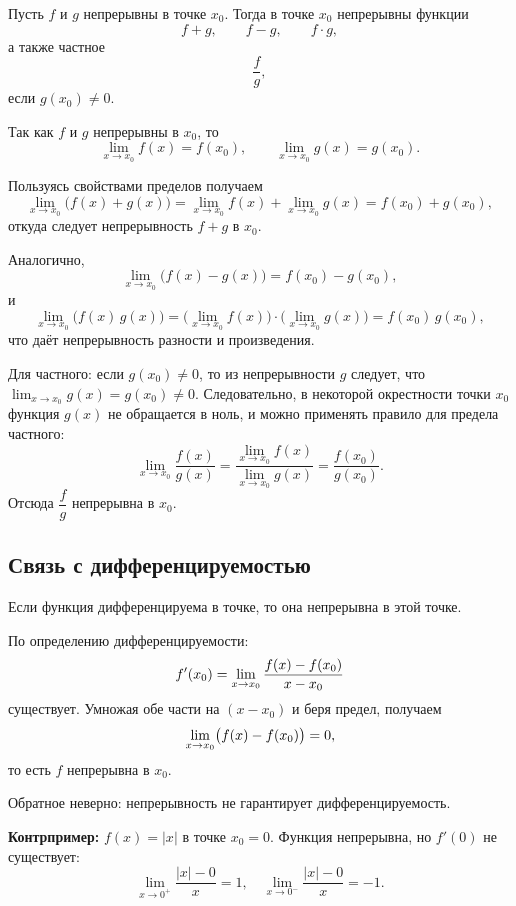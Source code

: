 \begin{theorem}
Пусть \(f\) и \(g\) непрерывны в точке \(x_0\). Тогда в точке \(x_0\) непрерывны функции
\[
f+g,\qquad f-g,\qquad f\cdot g,
\]
а также частное
\[
\frac{f}{g},
\]
если \(g(x_0)\neq0\).
\end{theorem}

\begin{Proof}
Так как \(f\) и \(g\) непрерывны в \(x_0\), то
\[
\lim_{x\to x_0} f(x)=f(x_0),\qquad \lim_{x\to x_0} g(x)=g(x_0).
\]

Пользуясь свойствами пределов получаем
\[
\lim_{x\to x_0}\bigl(f(x)+g(x)\bigr)
=\lim_{x\to x_0}f(x)+\lim_{x\to x_0}g(x)
=f(x_0)+g(x_0),
\]
откуда следует непрерывность \(f+g\) в \(x_0\).

Аналогично,
\[
\lim_{x\to x_0}\bigl(f(x)-g(x)\bigr)
=f(x_0)-g(x_0),
\]
и
\[
\lim_{x\to x_0}\bigl(f(x)\,g(x)\bigr)
=\bigl(\lim_{x\to x_0}f(x)\bigr)\cdot\bigl(\lim_{x\to x_0}g(x)\bigr)
=f(x_0)\,g(x_0),
\]
что даёт непрерывность разности и произведения.

Для частного: если \(g(x_0)\neq0\), то из непрерывности \(g\) следует, что \(\lim_{x\to x_0}g(x)=g(x_0)\neq0\). Следовательно, в некоторой окрестности точки \(x_0\) функция \(g(x)\) не обращается в ноль, и можно применять правило для предела частного:
\[
\lim_{x\to x_0}\frac{f(x)}{g(x)}
=\frac{\lim\limits_{x\to x_0}f(x)}{\lim\limits_{x\to x_0}g(x)}
=\frac{f(x_0)}{g(x_0)}.
\]
Отсюда \(\dfrac{f}{g}\) непрерывна в \(x_0\).
\end{Proof}

\subsection{Связь с дифференцируемостью}

Если функция дифференцируема в точке, то она непрерывна в этой точке.

\begin{Proof}
По определению дифференцируемости:
\[
f'(x_0) = \lim\limits_{x \to x_0} \frac{f(x)-f(x_0)}{x-x_0}
\]
существует. Умножая обе части на $(x-x_0)$ и беря предел, получаем
\[
\lim\limits_{x \to x_0} \bigl(f(x)-f(x_0)\bigr) = 0,
\]
то есть $f$ непрерывна в $x_0$.
\end{Proof}

\begin{remark}
Обратное неверно: непрерывность не гарантирует дифференцируемость. 

\textbf{Контрпример:} $f(x)=|x|$ в точке $x_0=0$. 
Функция непрерывна, но $f'(0)$ не существует:
\[
\lim_{x\to 0^+} \frac{|x|-0}{x} = 1, \quad
\lim_{x\to 0^-} \frac{|x|-0}{x} = -1.
\]
\end{remark}

